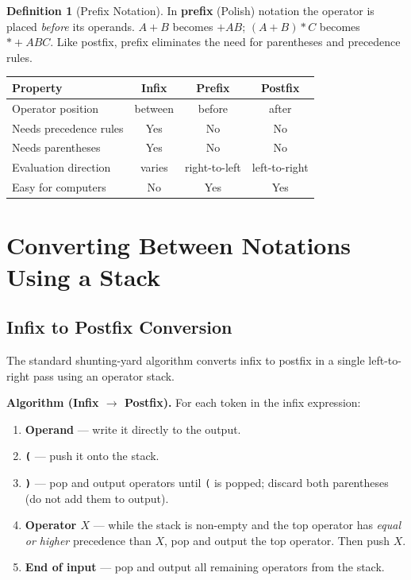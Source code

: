 \documentclass[11pt, a4paper, notitlepage]{report}
\theoremstyle{definition}
\newtheorem{definition}[theorem]{Definition}
\theoremstyle{remark}
\theoremstyle{definition}
\begin{document}
\begin{definition}[Prefix Notation]
\label{def:prefix}
In \textbf{prefix} (Polish) notation the operator is placed \emph{before} its operands.
$A + B$ becomes $+AB$; $(A + B) * C$ becomes $* {+} A B C$.  Like postfix, prefix
eliminates the need for parentheses and precedence rules.
\end{definition}

\begin{keyresult}[title={Key Result: Notation Comparison}]
\begin{center}
\begin{tabular}{@{} l c c c @{}}
\toprule
\textbf{Property}         & \textbf{Infix} & \textbf{Prefix} & \textbf{Postfix} \\
\midrule
Operator position         & between & before & after \\
Needs precedence rules    & Yes     & No     & No \\
Needs parentheses         & Yes     & No     & No \\
Evaluation direction      & varies  & right-to-left & left-to-right \\
Easy for computers        & No      & Yes    & Yes \\
\bottomrule
\end{tabular}
\end{center}
\end{keyresult}

\section{Converting Between Notations Using a Stack}
\label{sec:notation-conversion}

\subsection{Infix to Postfix Conversion}
\label{subsec:infix-to-postfix}

The standard shunting-yard algorithm converts infix to postfix in a single left-to-right
pass using an operator stack.

\textbf{Algorithm (Infix $\to$ Postfix).}  For each token in the infix expression:

\begin{enumerate}
  \item \textbf{Operand} --- write it directly to the output.
  \item \textbf{\texttt{(}} --- push it onto the stack.
  \item \textbf{\texttt{)}} --- pop and output operators until \texttt{(} is popped;
        discard both parentheses (do not add them to output).
  \item \textbf{Operator $X$} --- while the stack is non-empty and the top operator has
        \emph{equal or higher} precedence than $X$, pop and output the top operator.
        Then push $X$.
  \item \textbf{End of input} --- pop and output all remaining operators from the stack.
\end{enumerate}
\end{document}
